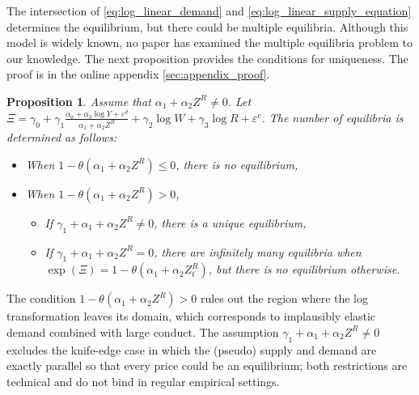 \documentclass[11pt, a4paper]{article}
\newtheorem{proposition}{Proposition}
\theoremstyle{remark}
\begin{document}
The intersection of \eqref{eq:log_linear_demand} and \eqref{eq:log_linear_supply_equation} determines the equilibrium, but there could be multiple equilibria.
Although this model is widely known, no paper has examined the multiple equilibria problem to our knowledge.
The next proposition provides the conditions for uniqueness.
The proof is in the online appendix \ref{sec:appendix_proof}.
\begin{proposition}\label{prop:equilibrium_existence}
    Assume that $\alpha_1 + \alpha_2 Z^{R}\ne 0$. Let $\Xi = \gamma_0 + \gamma_1\frac{\alpha_0 + \alpha_3 \log Y + \varepsilon^{d}}{\alpha_1 + \alpha_2 Z^{R}} +  \gamma_2 \log W + \gamma_3 \log R + \varepsilon^{c}$.
    The number of equilibria is determined as follows:
    \begin{itemize}
        \item When $1 - \theta (\alpha_1 + \alpha_2 Z^{R}) \le 0$, there is no equilibrium,
        \item When $1 - \theta (\alpha_1 + \alpha_2 Z^{R}) >0$, 
        \begin{itemize}
            \item If $ \gamma_1 +\alpha_1+\alpha_2 Z^R \ne 0$, there is a unique equilibrium,
            \item If $\gamma_1 + \alpha_1+\alpha_2 Z^R = 0$, there are infinitely many equilibria when $\exp(\Xi) = 1 - \theta (\alpha_1 + \alpha_2 Z^{R}_{t})$, but there is no equilibrium otherwise.
        \end{itemize}
    \end{itemize}
\end{proposition}
The condition $1-\theta(\alpha_1+\alpha_2 Z^R)>0$ rules out the region where the log transformation leaves its domain, which corresponds to implausibly elastic demand combined with large conduct. The assumption $\gamma_1+\alpha_1+\alpha_2 Z^R\ne0$ excludes the knife-edge case in which the (pseudo) supply and demand are exactly parallel so that every price could be an equilibrium; both restrictions are technical and do not bind in regular empirical settings.
\end{document}
